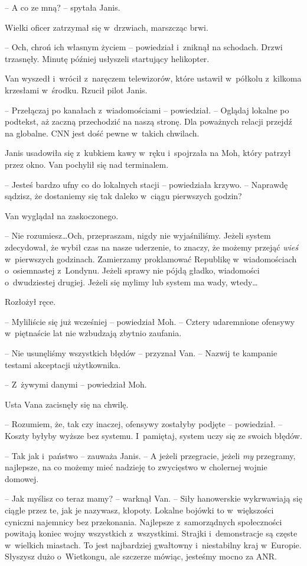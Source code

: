 \documentclass[oneside,polish,11pt,sfheadings]{mwbk}
\begin{document}
-- A co ze mną? -- spytała Janis.

Wielki oficer zatrzymał się w~drzwiach, marszcząc brwi.

-- Och, chroń ich własnym życiem -- powiedział i~zniknął na schodach.
Drzwi trzasnęły. Minutę później usłyszeli startujący helikopter.

Van wyszedł i~wrócił z~naręczem telewizorów, które ustawił w~półkolu z~kilkoma krzesłami w~środku. Rzucił pilot Janis.

-- Przełączaj po kanałach z~wiadomościami -- powiedział. -- Oglądaj lokalne
po podtekst, aż zaczną przechodzić na naszą stronę. Dla poważnych
relacji przejdź na globalne. CNN jest dość pewne w~takich chwilach.

Janis usadowiła się z~kubkiem kawy w~ręku i~spojrzała na Moh, który
patrzył przez okno. Van pochylił się nad terminalem.

-- Jesteś bardzo ufny co do lokalnych stacji -- powiedziała krzywo. -- Naprawdę sądzisz, że dostaniemy się tak daleko w~ciągu pierwszych
godzin?

Van wyglądał na zaskoczonego.

-- Nie rozumiesz\ldots Och, przepraszam, nigdy nie wyjaśniliśmy. Jeżeli
system zdecydował, że wybił czas na nasze uderzenie, to znaczy, że
możemy przejąć \emph{wieś} w~pierwszych godzinach. Zamierzamy
proklamować Republikę w~wiadomościach o~osiemnastej z~Londynu. Jeżeli
sprawy nie pójdą gładko, wiadomości o~dwudziestej drugiej. Jeżeli się
mylimy lub system ma wady, wtedy\ldots

Rozłożył ręce.

-- Myliliście się już wcześniej -- powiedział Moh. -- Cztery udaremnione
ofensywy w~piętnaście lat nie wzbudzają zbytnio zaufania.

-- Nie usunęliśmy wszystkich błędów -- przyznał Van. -- Nazwij te kampanie
testami akceptacji użytkownika.

-- Z~żywymi danymi -- powiedział Moh.

Usta Vana zacisnęły się na chwilę. 

-- Rozumiem, że, tak czy inaczej,
ofensywy zostałyby podjęte -- powiedział. -- Koszty byłyby wyższe bez
systemu. I~pamiętaj, system uczy się ze swoich błędów.

-- Tak jak i~państwo -- zauważa Janis. -- A jeżeli przegracie, jeżeli
\emph{my} przegramy, najlepsze, na co możemy mieć nadzieję to zwycięstwo
w cholernej wojnie domowej.

-- Jak myślisz co teraz mamy? -- warknął Van. -- Siły hanowerskie
wykrwawiają się ciągle przez te, jak je nazywasz, kłopoty. Lokalne
bojówki to w~większości cyniczni najemnicy bez przekonania. Najlepsze z~samorządnych społeczności powitają koniec wojny wszystkich z~wszystkimi.
Strajki i~demonstracje są częste w~wielkich miastach. To jest
najbardziej gwałtowny i~niestabilny kraj w~Europie. Słyszysz dużo o~Wietkongu, ale szczerze mówiąc, jesteśmy mocno za ANR.
\end{document}
